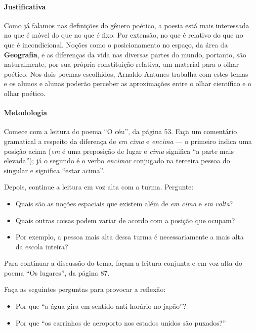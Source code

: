 \documentclass[11pt]{extarticle}
\begin{document}
\paragraph{Justificativa} Como já falamos nas definições do gênero poético,
a poesia está mais interessada no que é móvel do que no que é fixo. 
Por extensão, no que é relativo do que no que é incondicional. 
Noções como o posicionamento no espaço, da área da \textbf{Geografia}, 
e as diferenças da vida nas diversas partes do mundo, portanto,
são naturalmente, por sua própria constituição relativa, 
um material para o olhar poético. 
Nos dois poemas escolhidos, Arnaldo Antunes trabalha 
com estes temas e os alunos e alunas poderão perceber 
as aproximações entre o olhar científico e o olhar poético. 

\paragraph{Metodologia} Comece com a leitura do poema ``O céu'', da página 53.
Faça um comentário gramatical a respeito da diferença de \textit{em cima}
e \textit{encima} --- o primeiro indica uma posição acima (\textit{em} é uma preposição de lugar
e \textit{cima} significa ``a parte mais elevada''); já o segundo é o
verbo \textit{encimar} conjugado na terceira pessoa do singular e significa
``estar acima''.

Depois, continue a leitura em voz alta com a turma. 
Pergunte:

\begin{itemize}
\item Quais são as noções espaciais que existem além de \textit{em cima} e \textit{em volta}?
\item Quais outras coisas podem variar de acordo com a posição que ocupam?
\item Por exemplo, a pessoa mais alta dessa turma é necessariamente a mais alta da escola inteira?
\end{itemize}

Para continuar a discussão do tema, façam a leitura conjunta e em voz alta
do poema ``Os lugares'', da página 87.


Faça as seguintes perguntas para provocar a reflexão:

\begin{itemize}
\item Por que ``a água gira em sentido anti-horário no japão''?
\item Por que ``os carrinhos de aeroporto nos estados unidos são puxados?''
\end{itemize}
\end{document}

